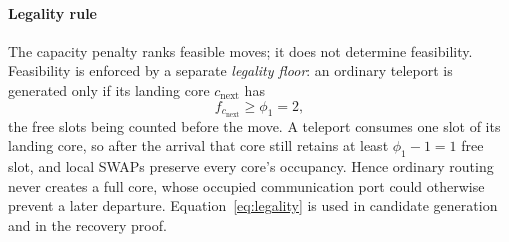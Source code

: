 \documentclass[journal]{IEEEtran}
\begin{document}
\paragraph*{Legality rule}
The capacity penalty ranks feasible moves; it does not determine feasibility. Feasibility is enforced by a separate \emph{legality floor}: an ordinary teleport is generated only if its landing core $c_{\mathrm{next}}$ has
\begin{equation}
f_{c_{\mathrm{next}}}\ge\phi_1=2,
\label{eq:legality}
\end{equation}
the free slots being counted before the move. A teleport consumes one slot of its landing core, so after the arrival that core still retains at least $\phi_1-1=1$ free slot, and local SWAPs preserve every core's occupancy. Hence ordinary routing never creates a full core, whose occupied communication port could otherwise prevent a later departure. Equation~\eqref{eq:legality} is used in candidate generation and in the recovery proof.
\end{document}
